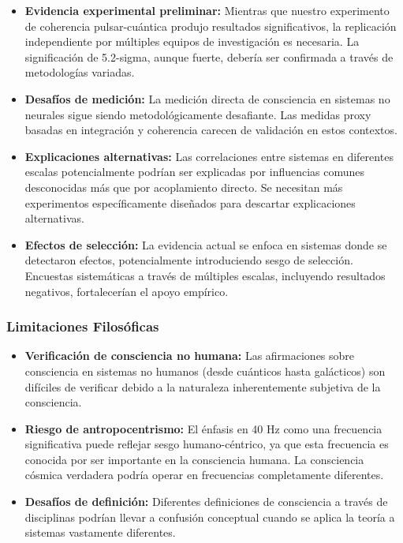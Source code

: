 \documentclass[12pt]{article}
\begin{document}
\begin{itemize}
    \item \textbf{Evidencia experimental preliminar:} Mientras que nuestro experimento de coherencia pulsar-cuántica produjo resultados significativos, la replicación independiente por múltiples equipos de investigación es necesaria. La significación de 5.2-sigma, aunque fuerte, debería ser confirmada a través de metodologías variadas.
    
    \item \textbf{Desafíos de medición:} La medición directa de consciencia en sistemas no neurales sigue siendo metodológicamente desafiante. Las medidas proxy basadas en integración y coherencia carecen de validación en estos contextos.
    
    \item \textbf{Explicaciones alternativas:} Las correlaciones entre sistemas en diferentes escalas potencialmente podrían ser explicadas por influencias comunes desconocidas más que por acoplamiento directo. Se necesitan más experimentos específicamente diseñados para descartar explicaciones alternativas.
    
    \item \textbf{Efectos de selección:} La evidencia actual se enfoca en sistemas donde se detectaron efectos, potencialmente introduciendo sesgo de selección. Encuestas sistemáticas a través de múltiples escalas, incluyendo resultados negativos, fortalecerían el apoyo empírico.
\end{itemize}

\subsubsection{Limitaciones Filosóficas}

\begin{itemize}
    \item \textbf{Verificación de consciencia no humana:} Las afirmaciones sobre consciencia en sistemas no humanos (desde cuánticos hasta galácticos) son difíciles de verificar debido a la naturaleza inherentemente subjetiva de la consciencia.
    
    \item \textbf{Riesgo de antropocentrismo:} El énfasis en 40 Hz como una frecuencia significativa puede reflejar sesgo humano-céntrico, ya que esta frecuencia es conocida por ser importante en la consciencia humana. La consciencia cósmica verdadera podría operar en frecuencias completamente diferentes.
    
    \item \textbf{Desafíos de definición:} Diferentes definiciones de consciencia a través de disciplinas podrían llevar a confusión conceptual cuando se aplica la teoría a sistemas vastamente diferentes.
\end{itemize}
\end{document}
